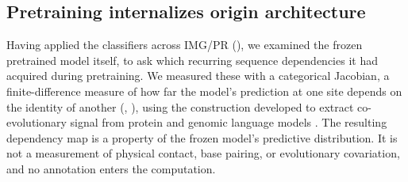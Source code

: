 \subsection*{Pretraining internalizes origin architecture}
\label{sec:interpretation}

Having applied the \model classifiers across IMG/PR
(), we examined the frozen pretrained model itself, to
ask which recurring sequence dependencies it had acquired during pretraining.
We measured these with a categorical Jacobian, a finite-difference measure of
how far the model's prediction at one site depends on the identity of another
(, ), using the
construction developed to extract co-evolutionary signal from protein and
genomic language models \cite{zhang2024protein,cornman2025omg}.
The resulting dependency map is a property of the frozen model's predictive
distribution. It is not a measurement of physical contact, base pairing, or
evolutionary covariation, and no annotation enters the computation.

